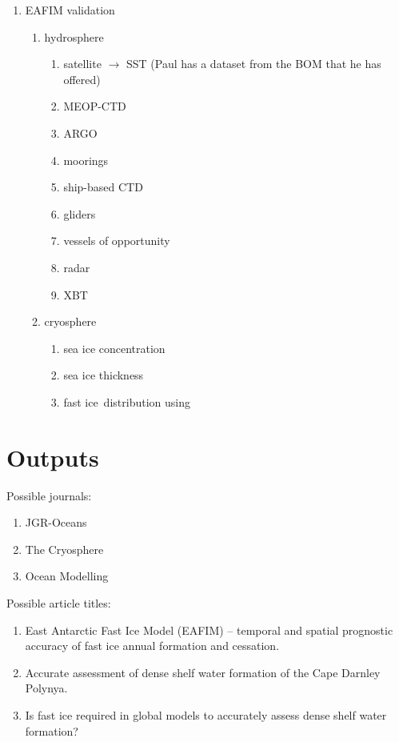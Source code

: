 \documentclass[11pt,a4paper]{article}
\newcommand{\fastice}{fast ice}
\begin{document}
\begin{enumerate}
\begin{enumerate}
  \end{enumerate}
\item EAFIM validation
  \begin{enumerate}
  \item hydrosphere
    \begin{enumerate}
    \item satellite $\rightarrow$ SST (Paul has a dataset from the BOM that he
      has offered)
    \item MEOP-CTD
    \item ARGO
    \item moorings
    \item ship-based CTD
    \item gliders
    \item vessels of opportunity
    \item radar
    \item XBT
    \end{enumerate}
    \item cryosphere
      \begin{enumerate}
      \item sea ice concentration
      \item sea ice thickness
      \item \fastice~distribution using \citep{Fraser2020}
      \end{enumerate}
  \end{enumerate}
\end{enumerate}

\section*{Outputs}
%

Possible journals:
\begin{enumerate}
\item JGR-Oceans
\item The Cryosphere
\item Ocean Modelling
\end{enumerate}

Possible article titles:
\begin{enumerate}
\item East Antarctic Fast Ice Model (EAFIM) -- temporal and spatial prognostic accuracy of fast ice annual formation and cessation.
\item Accurate assessment of dense shelf water formation of the Cape Darnley Polynya.
\item Is fast ice required in global models to accurately assess dense shelf water formation?
\end{enumerate}
\end{document}
